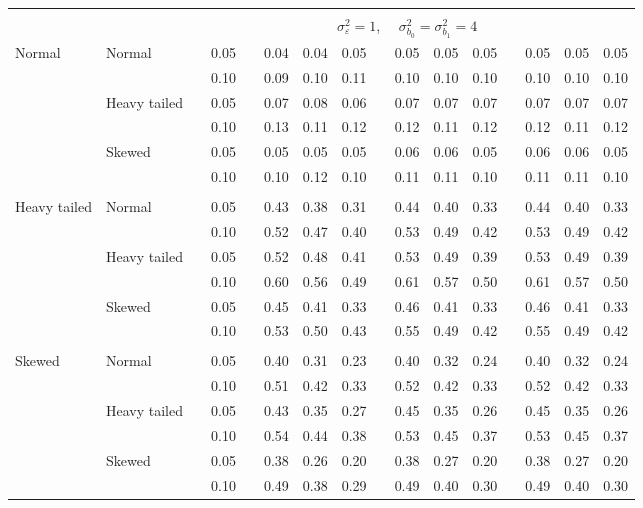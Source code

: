 \documentclass{article} %
\begin{document}
\begin{table}[ht]
\begin{scriptsize}
\begin{center}
\begin{tabular}{ll p{.1cm} c p{.1cm} rrr p{.1cm} rrr p{.1cm} rrr}
&&&&&&&&&&&&&&&\\
& && && \multicolumn{9}{c}{$\sigma_{\varepsilon}^2 = 1$, \ \ $\sigma_{b_0}^2 = \sigma_{b_1}^2 = 4$} \\ \cline{6-16}
\rowcolor{gray!20}Normal       & Normal       && 0.05 &&   0.04 & 0.04 & 0.05 && 0.05 & 0.05 & 0.05 && 0.05 & 0.05 & 0.05 \\ 
\rowcolor{gray!20}             &              && 0.10 &&   0.09 & 0.10 & 0.11 && 0.10 & 0.10 & 0.10 && 0.10 & 0.10 & 0.10 \\ 
\rowcolor{gray!20}             & Heavy tailed && 0.05 &&   0.07 & 0.08 & 0.06 && 0.07 & 0.07 & 0.07 && 0.07 & 0.07 & 0.07 \\ 
\rowcolor{gray!20}             &              && 0.10 &&   0.13 & 0.11 & 0.12 && 0.12 & 0.11 & 0.12 && 0.12 & 0.11 & 0.12 \\ 
\rowcolor{gray!20}             & Skewed       && 0.05 &&   0.05 & 0.05 & 0.05 && 0.06 & 0.06 & 0.05 && 0.06 & 0.06 & 0.05 \\ 
\rowcolor{gray!20}             &              && 0.10 &&   0.10 & 0.12 & 0.10 && 0.11 & 0.11 & 0.10 && 0.11 & 0.11 & 0.10 \\ 
             &&&&&&&&&&&&&&&\\
Heavy tailed & Normal       && 0.05 &&   0.43 & 0.38 & 0.31 && 0.44 & 0.40 & 0.33 && 0.44 & 0.40 & 0.33 \\ 
             &              && 0.10 &&   0.52 & 0.47 & 0.40 && 0.53 & 0.49 & 0.42 && 0.53 & 0.49 & 0.42 \\ 
             & Heavy tailed && 0.05 &&   0.52 & 0.48 & 0.41 && 0.53 & 0.49 & 0.39 && 0.53 & 0.49 & 0.39 \\ 
             &              && 0.10 &&   0.60 & 0.56 & 0.49 && 0.61 & 0.57 & 0.50 && 0.61 & 0.57 & 0.50 \\ 
             & Skewed       && 0.05 &&   0.45 & 0.41 & 0.33 && 0.46 & 0.41 & 0.33 && 0.46 & 0.41 & 0.33 \\ 
             &              && 0.10 &&   0.53 & 0.50 & 0.43 && 0.55 & 0.49 & 0.42 && 0.55 & 0.49 & 0.42 \\ 
             &&&&&&&&&&&&&&&\\
Skewed       & Normal       && 0.05 &&   0.40 & 0.31 & 0.23 && 0.40 & 0.32 & 0.24 && 0.40 & 0.32 & 0.24 \\ 
             &              && 0.10 &&   0.51 & 0.42 & 0.33 && 0.52 & 0.42 & 0.33 && 0.52 & 0.42 & 0.33 \\ 
             & Heavy tailed && 0.05 &&   0.43 & 0.35 & 0.27 && 0.45 & 0.35 & 0.26 && 0.45 & 0.35 & 0.26 \\ 
             &              && 0.10 &&   0.54 & 0.44 & 0.38 && 0.53 & 0.45 & 0.37 && 0.53 & 0.45 & 0.37 \\ 
             & Skewed       && 0.05 &&   0.38 & 0.26 & 0.20 && 0.38 & 0.27 & 0.20 && 0.38 & 0.27 & 0.20 \\ 
             &              && 0.10 &&   0.49 & 0.38 & 0.29 && 0.49 & 0.40 & 0.30 && 0.49 & 0.40 & 0.30 \\ 




\end{tabular}
\end{center}
\end{scriptsize}
\end{table}
\end{document}
